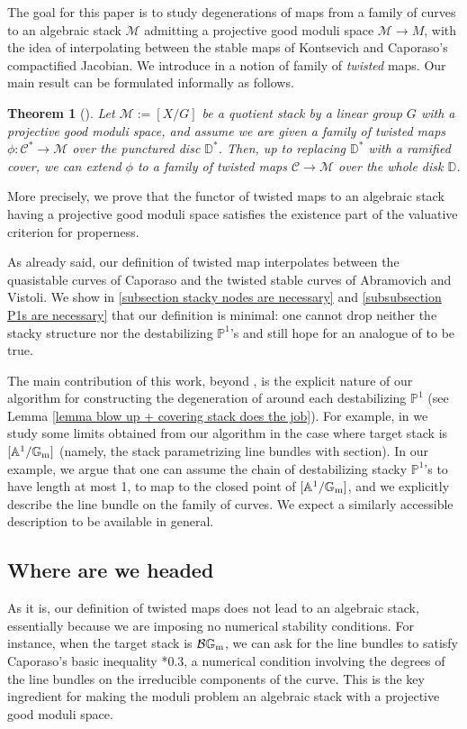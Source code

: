 \documentclass{amsart}
\newcommand{\bA}{\mathbb{A}}
\newcommand{\bG}{\mathbb{G}}
\newcommand{\bP}{\mathbb{P}}
\newcommand{\cB}{\mathcal{B}}
\newcommand{\cC}{\mathcal{C}}
\newcommand{\cM}{\mathcal{M}}
\newcommand{\Gm}{\bG_{{\rm m}}}
\newtheorem{Teo}[theorem]{Theorem}
\theoremstyle{definition}
\begin{document}
The goal for this paper is to study degenerations of maps from a family of curves to an algebraic stack $\cM$ admitting a projective good moduli space $\cM\to M$, with the idea of interpolating between the stable maps of Kontsevich and Caporaso's compactified Jacobian. We introduce in  a notion of family of \textit{twisted} maps. Our main result can be formulated informally as follows.
\begin{Teo}[]\label{main theorem intro}
 Let $\cM:=[X/G]$ be a quotient stack by a linear group $G$ with a projective good moduli space, and assume we are given a family of twisted maps $\phi:\cC^* \to \cM$ over the punctured disc $\mathbb{D}^*$. Then, up to replacing $\mathbb{D}^*$ with a ramified cover, we can extend $\phi$ to a family of twisted maps $\cC\to \cM$ over the whole disk $\mathbb{D}$.
\end{Teo}
More precisely, we prove that the functor of twisted maps to an algebraic stack having a projective good moduli space satisfies the existence part of the valuative criterion for properness. 

As already said, our definition of twisted map interpolates between the quasistable curves of Caporaso and the twisted stable curves of Abramovich and Vistoli. We show in \ref{subsection stacky nodes are necessary} and \ref{subsubsection P1s are necessary} that our definition is minimal: one cannot drop neither the stacky structure nor the destabilizing $\bP^1$'s and still hope for an analogue of  to be true.

The main contribution of this work, beyond , is the explicit nature of our algorithm for constructing the degeneration of  around each destabilizing $\bP^1$ (see Lemma \ref{lemma blow up + covering stack does the job}). 
For example, in  we study some limits obtained from our algorithm in the case where target stack is $[\bA^1/\Gm]$ (namely, the stack parametrizing line bundles with section). In our example, we argue that one can assume the chain of destabilizing stacky $\bP^1$'s to have length at most 1, to map to the closed point of $[\bA^1/\Gm]$, and we explicitly describe the line bundle on the family of curves. We expect a similarly accessible description to be available in general.

\subsection*{Where are we headed}
As it is, our definition of twisted maps does not lead to an algebraic stack, essentially because we are imposing no numerical stability conditions.
For instance, when the target stack is $\cB\Gm$, we can ask for the line bundles to satisfy Caporaso's basic inequality \cite{Cap}*{0.3}, a numerical condition involving the degrees of the line bundles on the irreducible components of the curve. This is the key ingredient for making the moduli problem an algebraic stack with a projective good moduli space.
\end{document}
